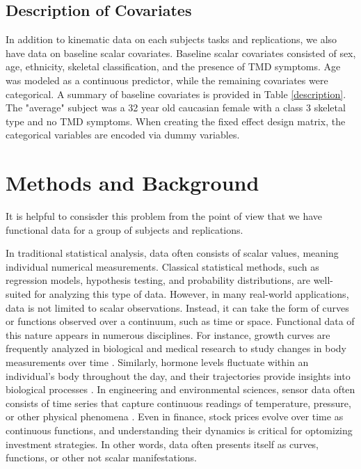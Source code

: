 \documentclass[AMA,Times1COL]{WileyNJDv5} %
\begin{document}
\subsection{Description of Covariates}
In addition to kinematic data on each subjects tasks and replications, we also have data on baseline scalar covariates.  Baseline scalar covariates consisted of sex, age, ethnicity, skeletal classification, and the presence of TMD symptoms. Age was modeled as a continuous predictor, while the remaining covariates were categorical.  A summary of baseline covariates is provided in Table \ref{description}.  The "average" subject was a 32 year old caucasian female with a class 3 skeletal type and no TMD symptoms.  When creating the fixed effect design matrix, the categorical variables are encoded via dummy variables.  

\section{Methods and Background}\label{sec2}

It is helpful to consisder this problem from the point of view that we have functional data for a group of subjects and replications.

In traditional statistical analysis, data often consists of scalar values, meaning individual numerical measurements.  Classical statistical methods, such as regression models, hypothesis testing, and probability distributions, are well-suited for analyzing this type of data.  However, in many real-world applications, data is not limited to scalar observations. Instead, it can take the form of curves or functions observed over a continuum, such as time or space. Functional data of this nature appears in numerous disciplines. For instance, growth curves are frequently analyzed in biological and medical research to study changes in body measurements over time \cite{rao_statistical_1958}.  Similarly, hormone levels fluctuate within an individual’s body throughout the day, and their trajectories provide insights into biological processes \cite{brumback_smoothing_1998}. In engineering and environmental sciences, sensor data often consists of time series that capture continuous readings of temperature, pressure, or other physical phenomena \cite{nikolova_curve_2009}. Even in finance, stock prices evolve over time as continuous functions, and understanding their dynamics is critical for optomizing investment strategies\cite{fama_behavior_1965}.  In other words, data often presents itself as curves, functions, or other not scalar manifestations.  
\end{document}
